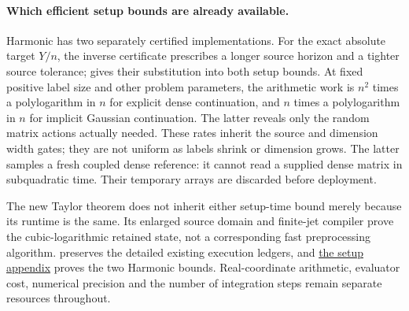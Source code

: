 \paragraph{Which efficient setup bounds are already available.}
Harmonic has two separately certified implementations. For the exact
absolute target $Y/n$, the inverse certificate prescribes a longer source
horizon and a tighter source tolerance;  gives
their substitution into both setup bounds. At fixed positive label size
and other problem parameters, the arithmetic work is $n^2$ times a
polylogarithm in $n$ for explicit dense continuation, and $n$ times a
polylogarithm in $n$ for implicit Gaussian continuation. The latter reveals
only the random matrix actions actually needed. These rates inherit the
source and dimension width gates; they
are not uniform as labels shrink or dimension grows. The latter samples a fresh
coupled dense reference: it cannot read a supplied dense matrix in
subquadratic time. Their temporary arrays are discarded before deployment.

The new Taylor theorem does not inherit either setup-time bound merely
because its runtime is the same. Its enlarged source domain and finite-jet
compiler prove the cubic-logarithmic retained state, not a corresponding
fast preprocessing algorithm.  preserves the
detailed existing execution ledgers, and
\hyperref[int:harmonic-efficient-setup-proofs]{the setup appendix}
proves the two Harmonic bounds. Real-coordinate arithmetic, evaluator
cost, numerical precision and the number of integration steps remain
separate resources throughout.
